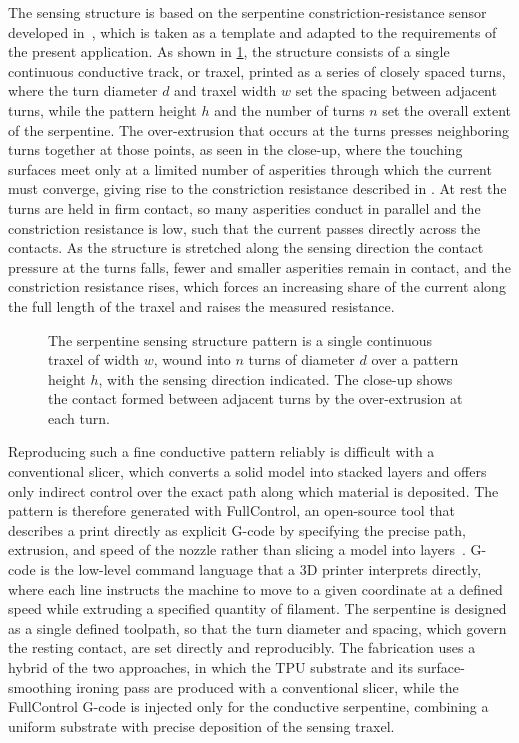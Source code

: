 The sensing structure is based on the serpentine constriction-resistance sensor developed in~\cite{G.O.A.T}, which is taken as a template and adapted to the requirements of the present application. As shown in \cref{fig:serpentine}, the structure consists of a single continuous conductive track, or traxel, printed as a series of closely spaced turns, where the turn diameter $d$ and traxel width $w$ set the spacing between adjacent turns, while the pattern height $h$ and the number of turns $n$ set the overall extent of the serpentine. 
The over-extrusion that occurs at the turns presses neighboring turns together at those points, as seen in the close-up, where the touching surfaces meet only at a limited number of asperities through which the current must converge, giving rise to the constriction resistance described in . At rest the turns are held in firm contact, so many asperities conduct in parallel and the constriction resistance is low, such that the current passes directly across the contacts. As the structure is stretched along the sensing direction the contact pressure at the turns falls, fewer and smaller asperities remain in contact, and the constriction resistance rises, which forces an increasing share of the current along the full length of the traxel and raises the measured resistance.

\begin{figure}
\centering

    \caption{The serpentine sensing structure pattern is a single continuous traxel of width $w$, wound into $n$ turns of diameter $d$ over a pattern height $h$, with the sensing direction indicated. The close-up shows the contact formed between adjacent turns by the over-extrusion at each turn.}
    \label{fig:serpentine}
\end{figure}

Reproducing such a fine conductive pattern reliably is difficult with a conventional slicer, which converts a solid model into stacked layers and offers only indirect control over the exact path along which material is deposited. The pattern is therefore generated with FullControl, an open-source tool that describes a print directly as explicit G-code by specifying the precise path, extrusion, and speed of the nozzle rather than slicing a model into layers~\cite{fullcontrol}. G-code is the low-level command language that a 3D printer interprets directly, where each line instructs the machine to move to a given coordinate at a defined speed while extruding a specified quantity of filament. The serpentine is designed as a single defined toolpath, so that the turn diameter and spacing, which govern the resting contact, are set directly and reproducibly. The fabrication uses a hybrid of the two approaches, in which the TPU substrate and its surface-smoothing ironing pass are produced with a conventional slicer, while the FullControl G-code is injected only for the conductive serpentine, combining a uniform substrate with precise deposition of the sensing traxel.

